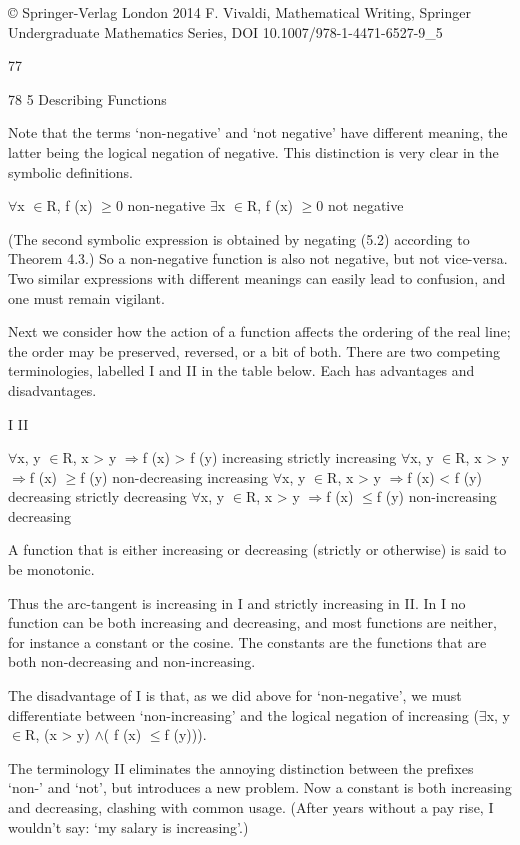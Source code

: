 \documentclass[11pt]{article}
\theoremstyle{plain}
\theoremstyle{definition}
\begin{document}
© Springer-Verlag London 2014 F. Vivaldi, Mathematical Writing, Springer Undergraduate Mathematics Series, DOI 10.1007/978-1-4471-6527-9\_5

77

78 5 Describing Functions

Note that the terms `non-negative' and `not negative' have different meaning, the latter being the logical negation of negative. This distinction is very clear in the symbolic definitions.

$\forall$x $\in$R, f (x) $\geq$0 non-negative $\exists$x $\in$R, f (x) $\geq$0 not negative

(The second symbolic expression is obtained by negating (5.2) according to Theorem 4.3.) So a non-negative function is also not negative, but not vice-versa. Two similar expressions with different meanings can easily lead to confusion, and one must remain vigilant.

Next we consider how the action of a function affects the ordering of the real line; the order may be preserved, reversed, or a bit of both. There are two competing terminologies, labelled I and II in the table below. Each has advantages and disadvantages.

I II

$\forall$x, y $\in$R, x > y $\Rightarrow$f (x) > f (y) increasing strictly increasing $\forall$x, y $\in$R, x > y $\Rightarrow$f (x) $\geq$f (y) non-decreasing increasing $\forall$x, y $\in$R, x > y $\Rightarrow$f (x) < f (y) decreasing strictly decreasing $\forall$x, y $\in$R, x > y $\Rightarrow$f (x) $\leq$f (y) non-increasing decreasing

A function that is either increasing or decreasing (strictly or otherwise) is said to be monotonic.

Thus the arc-tangent is increasing in I and strictly increasing in II. In I no function can be both increasing and decreasing, and most functions are neither, for instance a constant or the cosine. The constants are the functions that are both non-decreasing and non-increasing.

The disadvantage of I is that, as we did above for `non-negative', we must differentiate between `non-increasing' and the logical negation of increasing ($\exists$x, y $\in$R, (x > y) $\land$( f (x) $\leq$f (y))).

The terminology II eliminates the annoying distinction between the prefixes `non-' and `not', but introduces a new problem. Now a constant is both increasing and decreasing, clashing with common usage. (After years without a pay rise, I wouldn't say: `my salary is increasing'.)
\end{document}
